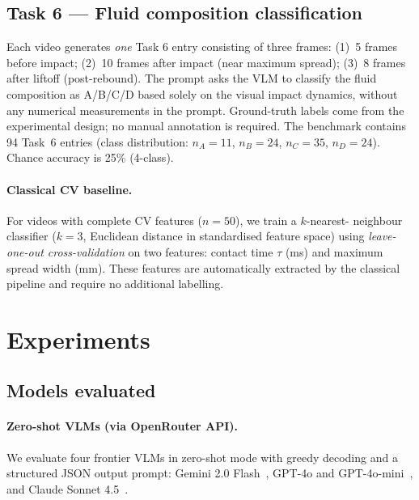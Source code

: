 \documentclass[10pt,twocolumn,letterpaper]{article}
\begin{document}
\subsection{Task 6 — Fluid composition classification}
\label{sec:task6}

Each video generates \emph{one} Task 6 entry consisting of three frames:
(1)~5 frames before impact; (2)~10 frames after impact (near maximum spread);
(3)~8 frames after liftoff (post-rebound).
The prompt asks the VLM to classify the fluid composition as A/B/C/D
based solely on the visual impact dynamics, without any numerical
measurements in the prompt.
Ground-truth labels come from the experimental design; no manual annotation
is required.
The benchmark contains 94 Task~6 entries (class distribution:
$n_A{=}11$, $n_B{=}24$, $n_C{=}35$, $n_D{=}24$).
Chance accuracy is 25\% (4-class).

\paragraph{Classical CV baseline.}
For videos with complete CV features ($n{=}50$), we train a $k$-nearest-
neighbour classifier ($k{=}3$, Euclidean distance in standardised feature
space) using \emph{leave-one-out cross-validation} on two features:
contact time $\tau$ (ms) and maximum spread width (mm).
These features are automatically extracted by the classical pipeline and
require no additional labelling.

\section{Experiments}
\label{sec:experiments}

\subsection{Models evaluated}

\paragraph{Zero-shot VLMs (via OpenRouter API).}
We evaluate four frontier VLMs in zero-shot mode with greedy decoding and
a structured JSON output prompt:
Gemini 2.0 Flash~\cite{gemini2flash},
GPT-4o and GPT-4o-mini~\cite{gpt4o},
and Claude Sonnet 4.5~\cite{claude35sonnet}.
\end{document}
